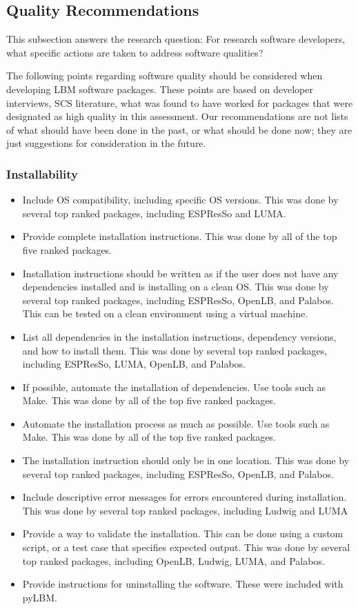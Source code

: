\documentclass[final, 3p, times, authoryear]{elsarticle}
\begin{document}
\subsection{Quality Recommendations} \label{qualityrecommentations}

This subsection answers the research question: For research software developers,
what specific actions are taken to address software qualities?

The following points regarding software quality should be considered when
developing LBM software packages. These points are based on developer
interviews, SCS literature, what was found to have worked for packages that were
designated as high quality in this assessment.  Our recommendations are not
lists of what should have been done in the past, or what should be done now;
they are just suggestions for consideration in the future.

\subsubsection{Installability}

\begin{itemize}
	\item Include OS compatibility, including specific OS versions. This was
	done by several top ranked packages, including ESPResSo and LUMA.
	\item Provide complete installation instructions. This was done by all of the top five ranked packages.
	\item Installation instructions should be written as if the user does not
	have any dependencies installed and is installing on a clean OS. This was
	done by several top ranked packages, including ESPResSo, OpenLB, and
	Palabos. This can be tested on a clean environment using a virtual machine.
	\item List all dependencies in the installation instructions, dependency
	versions, and how to install them. This was done by several top ranked
	packages, including ESPResSo, LUMA, OpenLB, and Palabos.
	\item If possible, automate the installation of dependencies. Use tools such
	as Make. This was done by all of the top five ranked packages.
	\item Automate the installation process as much as possible. Use tools such
	as Make. This was done by all of the top five ranked packages.
	\item The installation instruction should only be in one location. This was
	done by several top ranked packages, including ESPResSo, OpenLB, and
	Palabos.
	\item Include descriptive error messages for errors encountered during
	installation. This was done by several top ranked packages, including Ludwig
	and LUMA
	\item Provide a way to validate the installation. This can be done using a
	custom script, or a test case that specifies expected output. This was done
	by several top ranked packages, including OpenLB, Ludwig, LUMA, and Palabos.
	\item Provide instructions for uninstalling the software. These were included with pyLBM.
\end{itemize}
\end{document}
